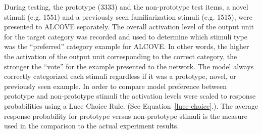 During testing, the prototype (3333) and the non-prototype test items, a novel stimuli (e.g. 1551) and a previously seen familiarization stimuli (e.g. 1515), were presented to ALCOVE separately.  The overall activation level of the output unit for the target category was recorded and used to determine which stimuli type was the ``preferred'' category example for ALCOVE.  In other words, the higher the activation of the output unit corresponding to the correct category, the stronger the ``vote'' for the example presented to the network.  The model always correctly categorized each stimuli regardless if it was a prototype, novel, or previously seen example. In order to compare model preference between prototype and non-prototype stimuli the activation levels were scaled to response probabilities using a Luce Choice Rule. (See Equation~\ref{luce-choice}.).  The average response probability for prototype versus non-prototype stimuli is the measure used in the comparison to the actual experiment results. 

